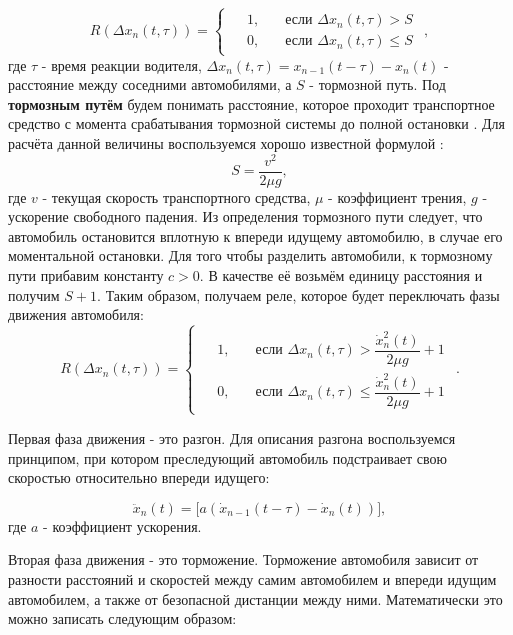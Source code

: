 \documentclass[12pt, a4paper]{extarticle}
\numberwithin{equation}{section}
\numberwithin{figure}{section}
\begin{document}
\begin{equation*}
R(\Delta x_{n}(t,\tau))=
\begin{cases}
\begin{split}
&1,\quad &\text{если }\Delta x_{n}(t,\tau) >S \\
&0,\quad &\text{если }\Delta x_{n}(t,\tau) \leq S
\end{split}
\end{cases},
\end{equation*}
где $\tau$ - время реакции водителя, $\Delta x_{n}(t,\tau)=x_{n-1}(t-\tau)-x_n(t)$ - расстояние между соседними автомобилями, а $S$ - тормозной путь. Под \textbf{тормозным путём} будем понимать расстояние, которое проходит транспортное средство с момента срабатывания тормозной системы до полной остановки \cite{PDD}. Для расчёта данной величины воспользуемся хорошо известной формулой \cite{Physics}:
\begin{equation*} 
S=\dfrac{v^2}{2\mu g},
\end{equation*}
где $v$ - текущая скорость транспортного средства, $\mu$ - коэффициент трения, $g$ - ускорение свободного падения. Из определения тормозного пути следует, что автомобиль остановится вплотную к впереди идущему автомобилю, в случае его моментальной остановки. Для того чтобы разделить автомобили, к тормозному пути прибавим константу $c > 0$. В качестве её возьмём единицу расстояния и получим $S+1$. Таким образом, получаем реле, которое будет переключать фазы движения автомобиля:
\begin{equation}\label{rele}
R(\Delta x_{n}(t,\tau))=
\begin{cases}
\begin{split}
&1,\quad &\text{если }\Delta x_{n}(t,\tau) > \dfrac{\dot{x}_n^2(t)}{2\mu g}+1 \\
&0,\quad &\text{если }\Delta x_{n}(t,\tau) \leq \dfrac{\dot{x}_n^2(t)}{2\mu g}+1
\end{split}
\end{cases}.
\end{equation}

Первая фаза движения - это разгон. Для описания разгона воспользуемся принципом, при котором преследующий автомобиль подстраивает свою скоростью относительно впереди идущего:

\begin{equation*}
\ddot{x}_n(t)= \bigg[ a(\dot{x}_{n-1}(t-\tau)-\dot{x}_n(t))\bigg],
\end{equation*}
где $a$ - коэффициент ускорения.

Вторая фаза движения - это торможение. Торможение автомобиля зависит от разности расстояний и скоростей между самим автомобилем и впереди идущим автомобилем, а также от безопасной дистанции между ними. Математически это можно записать следующим образом: 
\end{document}
